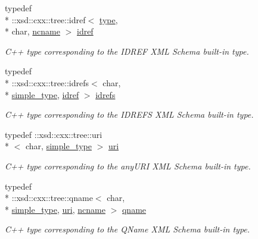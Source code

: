 \begin{DoxyCompactItemize}
typedef \\*
\+::xsd\+::cxx\+::tree\+::idref$<$ \hyperlink{namespacexml__schema_a3d277dc807f2e4ec4261dcef5c04a836}{type}, \\*
char, \hyperlink{namespacexml__schema_a926a5ddb21b27435d0206310d8fc67b7}{ncname} $>$ \hyperlink{namespacexml__schema_ac4af625f2450257be84f5475dbfe8fdd}{idref}
\begin{DoxyCompactList}\small\item\em C++ type corresponding to the I\+D\+R\+E\+F X\+M\+L Schema built-\/in type. \end{DoxyCompactList}\item 
typedef \\*
\+::xsd\+::cxx\+::tree\+::idrefs$<$ char, \\*
\hyperlink{namespacexml__schema_a44789bb4367951bcf8ae867cb983324d}{simple\+\_\+type}, \hyperlink{namespacexml__schema_ac4af625f2450257be84f5475dbfe8fdd}{idref} $>$ \hyperlink{namespacexml__schema_adb5f7e4c5a09caf31f94ace50b148674}{idrefs}
\begin{DoxyCompactList}\small\item\em C++ type corresponding to the I\+D\+R\+E\+F\+S X\+M\+L Schema built-\/in type. \end{DoxyCompactList}\item 
typedef \+::xsd\+::cxx\+::tree\+::uri\\*
$<$ char, \hyperlink{namespacexml__schema_a44789bb4367951bcf8ae867cb983324d}{simple\+\_\+type} $>$ \hyperlink{namespacexml__schema_a2518fddf119bd258d7443408863ee457}{uri}
\begin{DoxyCompactList}\small\item\em C++ type corresponding to the any\+U\+R\+I X\+M\+L Schema built-\/in type. \end{DoxyCompactList}\item 
typedef \\*
\+::xsd\+::cxx\+::tree\+::qname$<$ char, \\*
\hyperlink{namespacexml__schema_a44789bb4367951bcf8ae867cb983324d}{simple\+\_\+type}, \hyperlink{namespacexml__schema_a2518fddf119bd258d7443408863ee457}{uri}, \hyperlink{namespacexml__schema_a926a5ddb21b27435d0206310d8fc67b7}{ncname} $>$ \hyperlink{namespacexml__schema_af47d5d85d1b1714be503513b1c09c079}{qname}
\begin{DoxyCompactList}\small\item\em C++ type corresponding to the Q\+Name X\+M\+L Schema built-\/in type. \end{DoxyCompactList}\item 

\end{DoxyCompactItemize}
